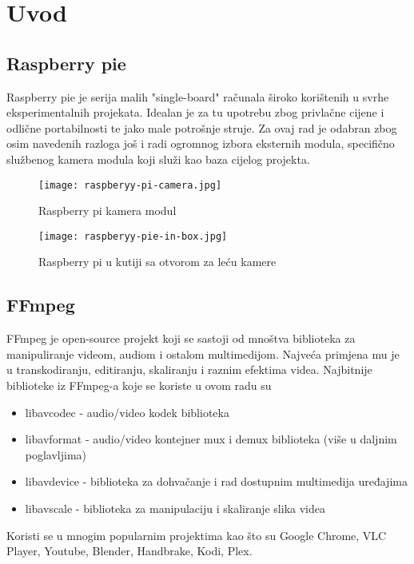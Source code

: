 \section{Uvod}
\subsection{Raspberry pie}
Raspberry pie je serija malih "single-board" računala široko korištenih u svrhe eksperimentalnih projekata.
\paraBreak
Idealan je za tu upotrebu zbog privlačne cijene i odlične portabilnosti te jako male potrošnje struje.
\paraBreak
Za ovaj rad je odabran zbog osim navedenih razloga još i radi ogromnog izbora eksternih modula, specifično službenog kamera modula
koji služi kao baza cijelog projekta.

\begin{figure}[ht]
  \centering
  \texttt{[image: raspberyy-pi-camera.jpg]}
  \caption{Raspberry pi kamera modul}
\end{figure}

\begin{figure}[ht]
  \centering
  \texttt{[image: raspberyy-pie-in-box.jpg]}
  \caption{Raspberry pi u kutiji sa otvorom za leću kamere}
\end{figure}

\clearpage
\subsection{FFmpeg}
FFmpeg je open-source projekt koji se sastoji od mnoštva biblioteka za manipuliranje videom, audiom i ostalom multimedijom.
\paraBreak
Najveća primjena mu je u transkodiranju, editiranju, skaliranju i raznim efektima videa.
\paraBreak
Najbitnije biblioteke iz FFmpeg-a koje se koriste u ovom radu su
\begin{itemize}
  \item libavcodec - audio/video kodek biblioteka
  \item libavformat - audio/video kontejner mux i demux biblioteka (više u daljnim poglavljima)
  \item libavdevice - biblioteka za dohvačanje i rad dostupnim multimedija uređajima
  \item libavscale - biblioteka za manipulaciju i skaliranje slika videa
\end{itemize}
Koristi se u mnogim popularnim projektima kao što su Google Chrome, VLC Player, Youtube, Blender, Handbrake, Kodi, Plex.
